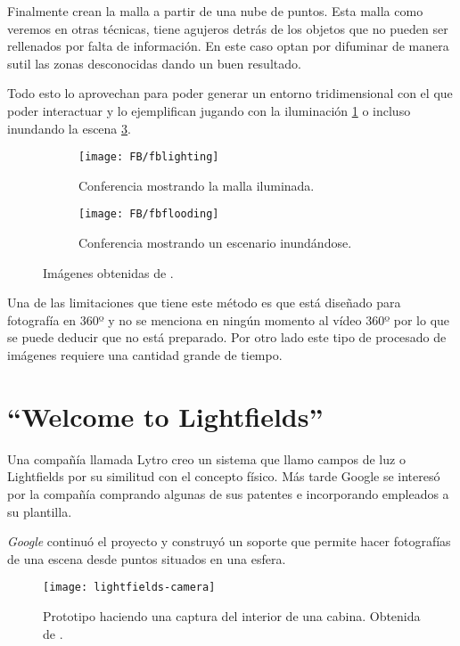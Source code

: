 Finalmente crean la malla a partir de una nube de puntos. Esta malla como veremos en otras técnicas, tiene agujeros detrás de los objetos que no pueden ser rellenados por falta de información. En este caso optan por difuminar de manera sutil las zonas desconocidas dando un buen resultado.

Todo esto lo aprovechan para poder generar un entorno tridimensional con el que poder interactuar y lo ejemplifican jugando con la iluminación \ref{fig:fblighting-example} o incluso inundando la escena \ref{fig:fbflooding-example}.

\begin{figure}[h]
\centering
\begin{subfigure}{.47\linewidth}
	\centering
	\texttt{[image: FB/fblighting]}
  \caption{Conferencia mostrando la malla iluminada.}
  \label{fig:fblighting-example}
\end{subfigure}%
\hspace{.05\linewidth}
\begin{subfigure}{.47\linewidth}
	\centering
	\texttt{[image: FB/fbflooding]}
  \caption{Conferencia mostrando un escenario inundándose.}
  \label{fig:fbflooding-example}
\end{subfigure}
\caption{Imágenes obtenidas de \cite{FBCasual3DCapture}.}
\end{figure}

Una de las limitaciones que tiene este método es que está diseñado para fotografía en 360º y no se menciona en ningún momento al vídeo 360º por lo que se puede deducir que no está preparado. Por otro lado este tipo de procesado de imágenes requiere una cantidad grande de tiempo.

\section{``Welcome to Lightfields''}
Una compañía llamada Lytro creo un sistema que llamo campos de luz o Lightfields \cite{LytroLightfields} por su similitud con el concepto físico. Más tarde Google se interesó por la compañía comprando algunas de sus patentes e incorporando empleados a su plantilla.

\textit{Google} continuó el proyecto \cite{GoogleLightfields} y construyó un soporte que permite hacer fotografías de una escena desde puntos situados en una esfera.

\begin{figure}[h]
  \centering
	\texttt{[image: lightfields-camera]}
  \caption{Prototipo haciendo una captura del interior de una cabina. Obtenida de \cite{GoogleLightfields}.}
  \label{fig:lightfields-camera}
\end{figure}


